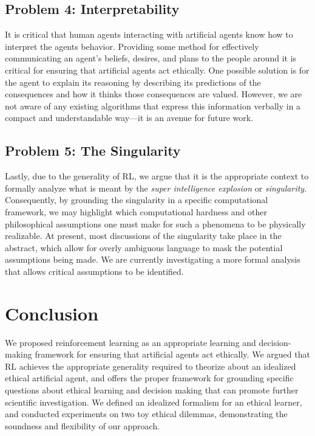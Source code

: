 \documentclass[11pt]{article}
\begin{document}
{\subsection{Problem 4: Interpretability} It is critical that human agents interacting with artificial agents know how to interpret the agents behavior. Providing some method for effectively communicating an agent's beliefs, desires, and plans to the people around it is critical for ensuring that artificial agents act ethically. One possible solution is for the agent to explain its reasoning by describing its predictions of the consequences and how it thinks those consequences are valued. However, we are not aware of any existing algorithms that express this information verbally in a compact and understandable way---it is an avenue for future work.

\subsection{Problem 5: The Singularity} Lastly, due to the generality of RL, we argue that it is the appropriate context to formally analyze what is meant by the {\it super intelligence explosion} or {\it singularity}. Consequently, by grounding the singularity in a specific computational framework, we may highlight which computational hardness and other philosophical assumptions one must make for such a phenomena to be physically realizable. At present, most discussions of the singularity take place in the abstract, which allow for overly ambiguous language to mask the potential assumptions being made. We are currently investigating a more formal analysis that allows critical assumptions to be identified.


\section{Conclusion}

We proposed reinforcement learning as an appropriate learning and decision-making framework for ensuring that artificial agents act ethically. We argued that RL achieves the appropriate generality required to theorize about an idealized ethical artificial agent, and offers the proper framework for grounding specific questions about ethical learning and decision making that can promote further scientific investigation. We defined an idealized formalism for an ethical learner, and conducted experiments on two toy ethical dilemmas, demonstrating the soundness and flexibility of our approach.

}
\end{document}
